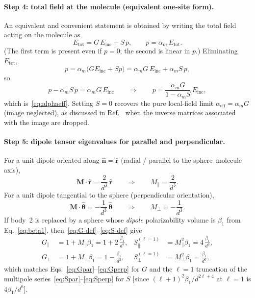 \documentclass[11pt,a4paper]{article}
\begin{document}
\paragraph{Step 4: total field at the molecule (equivalent one-site form).}
An equivalent and convenient statement is obtained by writing the total field
acting on the molecule as
\begin{equation}
  E_{\mathrm{tot}}
  =
  G\, E_{\mathrm{inc}}
  +
  S\, p,
  \qquad
  p
  =
  \alpha_m\, E_{\mathrm{tot}}.
  \label{eq:Etot}
\end{equation}
(The first term is present even if $p=0$; the second is linear in $p$.)
Eliminating $E_{\mathrm{tot}}$,
\begin{equation}
  p
  =
  \alpha_m\bigl(G E_{\mathrm{inc}} + S p\bigr)
  =
  \alpha_m G\, E_{\mathrm{inc}}
  +
  \alpha_m S\, p,
\end{equation}
so
\begin{equation}
  p - \alpha_m S\, p
  =
  \alpha_m G\, E_{\mathrm{inc}}
  \qquad\Rightarrow\qquad
  p
  =
  \frac{\alpha_m G}{1-\alpha_m S}\, E_{\mathrm{inc}},
\end{equation}
which is~\eqref{eq:alphaeff}.  Setting $S=0$ recovers the pure local-field limit
$\alpha_{\mathrm{eff}}=\alpha_m G$ (image neglected), as discussed in
Ref.~ when the inverse matrices associated with the image
are dropped.

\paragraph{Step 5: dipole tensor eigenvalues for parallel and perpendicular.}
For a unit dipole oriented along $\hat{\mathbf{n}}=\hat{\mathbf{r}}$ (radial /
parallel to the sphere--molecule axis),
\begin{equation}
  \mathbf{M}\cdot\hat{\mathbf{r}}
  =
  \frac{2}{d^3}\,\hat{\mathbf{r}}
  \qquad\Rightarrow\qquad
  M_\parallel = \frac{2}{d^3}.
\end{equation}
For a unit dipole tangential to the sphere (perpendicular orientation),
\begin{equation}
  \mathbf{M}\cdot\hat{\boldsymbol{\theta}}
  =
  -\frac{1}{d^3}\,\hat{\boldsymbol{\theta}}
  \qquad\Rightarrow\qquad
  M_\perp = -\frac{1}{d^3}.
\end{equation}
If body~2 is replaced by a sphere whose \emph{dipole} polarizability volume is
$\beta_1$ from Eq.~\eqref{eq:beta1}, then~\eqref{eq:G-def}--\eqref{eq:S-def} give
\begin{align}
  G_\parallel
  &=
  1 + M_\parallel\beta_1
  =
  1 + 2\,\frac{\beta_1}{d^3},
  &
  S_\parallel^{(\ell=1)}
  &=
  M_\parallel^2\beta_1
  =
  4\,\frac{\beta_1}{d^6},
  \label{eq:GSdip-par} \\[0.35em]
  G_\perp
  &=
  1 + M_\perp\beta_1
  =
  1 - \frac{\beta_1}{d^3},
  &
  S_\perp^{(\ell=1)}
  &=
  M_\perp^2\beta_1
  =
  \frac{\beta_1}{d^6},
  \label{eq:GSdip-perp}
\end{align}
which matches Eqs.~\eqref{eq:Gpar}--\eqref{eq:Gperp} for $G$ and the $\ell=1$
truncation of the multipole series~\eqref{eq:Spar}--\eqref{eq:Sperp} for $S$
[since $(\ell+1)^2\beta_1/d^{2\ell+4}$ at $\ell=1$ is $4\beta_1/d^6$].
\end{document}
